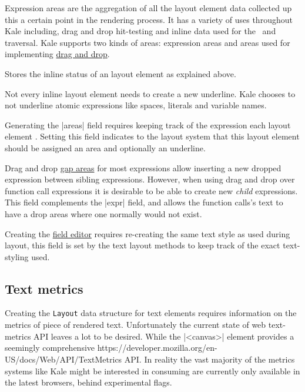  Expression areas are the aggregation of all the layout element
data collected up this a certain point in the rendering process. It has a
variety of uses throughout Kale including, drag and drop hit-testing and inline
data used for the~\ak{^} and~ traversal. Kale supports two kinds of
areas: expression areas and  areas used for implementing
\hyperref[impl:dnd]{drag and drop}.

 Stores the inline status of an layout element as explained
above.

 Not every inline layout element needs to create
a new underline. Kale
chooses to not underline atomic expressions like spaces, literals and variable
names.

 Generating the |areas| field requires keeping track of the
expression each layout element . Setting this field indicates
to the layout system that this layout element should be assigned an area and
optionally an underline.

 Drag and drop \hyperref[layout:areas]{gap areas} for most
expressions allow inserting a new dropped expression between sibling
expressions. However, when using drag and drop over function call expressions
it is desirable to be able to create new \emph{child} expressions. This field
complements the |expr| field, and allows the function calls's text to have a
drop areas where one normally would not exist.

 Creating the \hyperref[soln:field_editing]{field editor} requires
re-creating the same text style as used during layout, this field is set by the
text layout methods to keep track of the exact text-styling used.

\subsection{Text metrics}

Creating the \texttt{Layout} data structure for text elements requires
information on the metrics of piece of rendered text. Unfortunately the current
state of web text-metrics API leaves a lot to be desired. While
the |<canvas>| element provides a seemingly comprehensive
{https://developer.mozilla.org/en-US/docs/Web/API/TextMetrics} API.
In reality the vast majority of the metrics systems like Kale might
be interested in consuming are currently only available in the latest
browsers, behind experimental flags.


